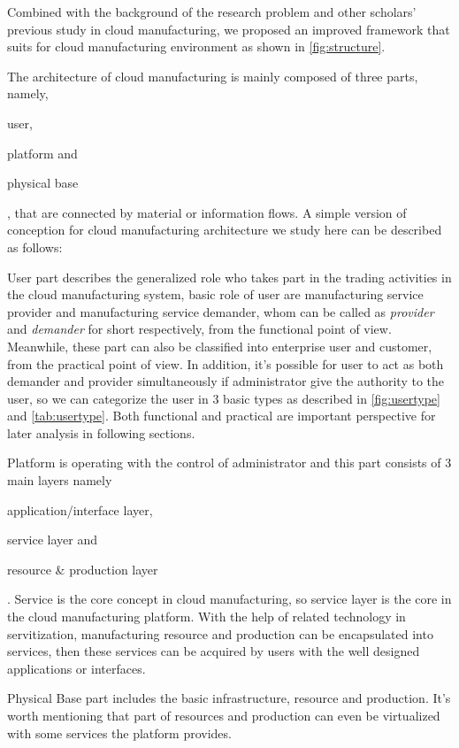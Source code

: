 Combined with the background of the research problem and other scholars' previous study in cloud manufacturing, we proposed an improved framework that suits for cloud manufacturing environment as shown in \autoref{fig:structure}.

The architecture of cloud manufacturing is mainly composed of three parts, namely, \begin{inparaenum}[1)]
\item user,
\item platform and
\item physical base
\end{inparaenum}, that are connected by material or information flows. A simple version of conception for cloud manufacturing architecture we study here can be described as follows:
\begin{compactdesc}
\item [User] part describes the generalized role who takes part in the trading activities in the cloud manufacturing system, basic role of user are manufacturing service provider and manufacturing service demander, whom can be called as \textit{provider} and \textit{demander} for short respectively, from the functional point of view. Meanwhile, these part can also be classified into enterprise user and customer, from the practical point of view. In addition, it's possible for user to act as both demander and provider simultaneously if administrator give the authority to the user, so we can categorize the user in 3 basic types as described in \autoref{fig:usertype} and \autoref{tab:usertype}. Both functional and practical are important perspective for later analysis in following sections.
\item [Platform] is operating with the control of administrator and this part consists of 3 main layers namely
	\begin{inparaenum}[1)]
	\item application/interface layer,
	\item service layer and
	\item resource \& production layer
	\end{inparaenum}.
Service is the core concept in cloud manufacturing, so service layer is the core in the cloud manufacturing platform. With the help of related technology in servitization, manufacturing resource and production can be encapsulated into services, then these services can be acquired by users with the well designed applications or interfaces.
\item [Physical Base] part includes the basic infrastructure, resource and production. It's worth mentioning that part of resources and production can even be virtualized with some services the platform provides.
\end{compactdesc}

